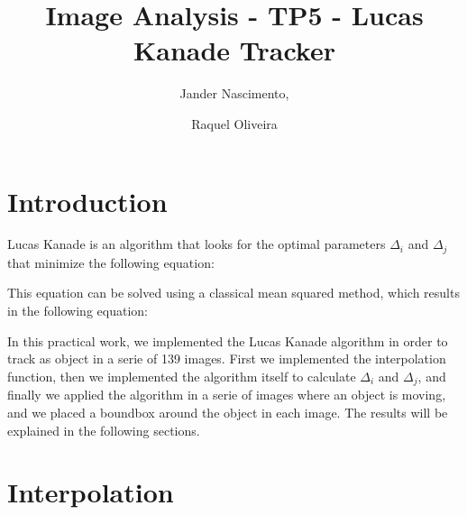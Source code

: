 \documentclass{article}
\begin{document}
\title{Image Analysis - TP5 - Lucas Kanade Tracker}

\author{Jander Nascimento, 
\and Raquel Oliveira}

\maketitle

\section{Introduction}

	Lucas Kanade is an algorithm that looks for the optimal parameters $\Delta_i$ and $\Delta_j$ that minimize the following equation:

	\begin{figure}[H]
		  \centering
		  \caption{}
		  \label{fig:formula1}
	\end{figure}

	This equation can be solved using a classical mean squared method, which results in the following equation:

	\begin{figure}[H]
		  \centering
		  \caption{}
		  \label{fig:formula2}
	\end{figure}	

	In this practical work, we implemented the Lucas Kanade algorithm in order to track as object in a serie of 139 images. First we implemented the interpolation function, then we implemented the algorithm itself to calculate $\Delta_i$ and $\Delta_j$, and finally we applied the algorithm in a serie of images where an object is moving, and we placed a boundbox around the object in each image. The results will be explained in the following sections.


\section{Interpolation}
\end{document}
